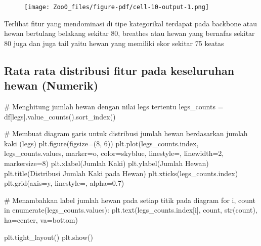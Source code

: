 \documentclass[
  letterpaper,
]{krantz}
\makeatletter
\newenvironment{Shaded}{\begin{snugshade}}{\end{snugshade}}
\newcommand{\BuiltInTok}[1]{\textcolor[rgb]{0.00,0.23,0.31}{#1}}
\newcommand{\CommentTok}[1]{\textcolor[rgb]{0.37,0.37,0.37}{#1}}
\newcommand{\ControlFlowTok}[1]{\textcolor[rgb]{0.00,0.23,0.31}{#1}}
\newcommand{\DecValTok}[1]{\textcolor[rgb]{0.68,0.00,0.00}{#1}}
\newcommand{\FloatTok}[1]{\textcolor[rgb]{0.68,0.00,0.00}{#1}}
\newcommand{\KeywordTok}[1]{\textcolor[rgb]{0.00,0.23,0.31}{#1}}
\newcommand{\NormalTok}[1]{\textcolor[rgb]{0.00,0.23,0.31}{#1}}
\newcommand{\OperatorTok}[1]{\textcolor[rgb]{0.37,0.37,0.37}{#1}}
\newcommand{\StringTok}[1]{\textcolor[rgb]{0.13,0.47,0.30}{#1}}
\newenvironment{kframe}{%
\medskip{}
\setlength{\fboxsep}{.8em}
 \def\at@end@of@kframe{}%
 \ifinner\ifhmode%
  \def\at@end@of@kframe{\end{minipage}}%
  \begin{minipage}{\columnwidth}%
 \fi\fi%
 \def\FrameCommand##1{\hskip\@totalleftmargin \hskip-\fboxsep
 \colorbox{shadecolor}{##1}\hskip-\fboxsep
     \hskip-\linewidth \hskip-\@totalleftmargin \hskip\columnwidth}%
 \MakeFramed {\advance\hsize-\width
   \@totalleftmargin\z@ \linewidth\hsize
   \@setminipage}}%
 {\par\unskip\endMakeFramed%
 \at@end@of@kframe}
\renewenvironment{Shaded}{\begin{kframe}}{\end{kframe}}
\makeatother
\begin{document}
\begin{figure}[H]

{\centering \texttt{[image: Zoo0\_files/figure-pdf/cell-10-output-1.png]}

}

\end{figure}

Terlihat fitur yang mendominasi di tipe kategorikal terdapat pada
backbone atau hewan bertulang belakang sekitar 80, breathes atau hewan
yang bernafas sekitar 80 juga dan juga tail yaitu hewan yang memiliki
ekor sekitar 75 keatas

\hypertarget{rata-rata-distribusi-fitur-pada-keseluruhan-hewan-numerik}{%
\subsection{Rata rata distribusi fitur pada keseluruhan hewan
(Numerik)}\label{rata-rata-distribusi-fitur-pada-keseluruhan-hewan-numerik}}

\begin{Shaded}
\begin{Highlighting}[]
\CommentTok{\# Menghitung jumlah hewan dengan nilai legs tertentu}
\NormalTok{legs\_counts }\OperatorTok{=}\NormalTok{ df[}\StringTok{\textquotesingle{}legs\textquotesingle{}}\NormalTok{].value\_counts().sort\_index()}

\CommentTok{\# Membuat diagram garis untuk distribusi jumlah hewan berdasarkan jumlah kaki (legs)}
\NormalTok{plt.figure(figsize}\OperatorTok{=}\NormalTok{(}\DecValTok{8}\NormalTok{, }\DecValTok{6}\NormalTok{))}
\NormalTok{plt.plot(legs\_counts.index, legs\_counts.values, marker}\OperatorTok{=}\StringTok{\textquotesingle{}o\textquotesingle{}}\NormalTok{, color}\OperatorTok{=}\StringTok{\textquotesingle{}skyblue\textquotesingle{}}\NormalTok{, linestyle}\OperatorTok{=}\StringTok{\textquotesingle{}{-}\textquotesingle{}}\NormalTok{, linewidth}\OperatorTok{=}\DecValTok{2}\NormalTok{, markersize}\OperatorTok{=}\DecValTok{8}\NormalTok{)}
\NormalTok{plt.xlabel(}\StringTok{\textquotesingle{}Jumlah Kaki\textquotesingle{}}\NormalTok{)}
\NormalTok{plt.ylabel(}\StringTok{\textquotesingle{}Jumlah Hewan\textquotesingle{}}\NormalTok{)}
\NormalTok{plt.title(}\StringTok{\textquotesingle{}Distribusi Jumlah Kaki pada Hewan\textquotesingle{}}\NormalTok{)}
\NormalTok{plt.xticks(legs\_counts.index)}
\NormalTok{plt.grid(axis}\OperatorTok{=}\StringTok{\textquotesingle{}y\textquotesingle{}}\NormalTok{, linestyle}\OperatorTok{=}\StringTok{\textquotesingle{}{-}{-}\textquotesingle{}}\NormalTok{, alpha}\OperatorTok{=}\FloatTok{0.7}\NormalTok{)}

\CommentTok{\# Menambahkan label jumlah hewan pada setiap titik pada diagram}
\ControlFlowTok{for}\NormalTok{ i, count }\KeywordTok{in} \BuiltInTok{enumerate}\NormalTok{(legs\_counts.values):}
\NormalTok{    plt.text(legs\_counts.index[i], count, }\BuiltInTok{str}\NormalTok{(count), ha}\OperatorTok{=}\StringTok{\textquotesingle{}center\textquotesingle{}}\NormalTok{, va}\OperatorTok{=}\StringTok{\textquotesingle{}bottom\textquotesingle{}}\NormalTok{)}

\NormalTok{plt.tight\_layout()}
\NormalTok{plt.show()}
\end{Highlighting}
\end{Shaded}
\end{document}
